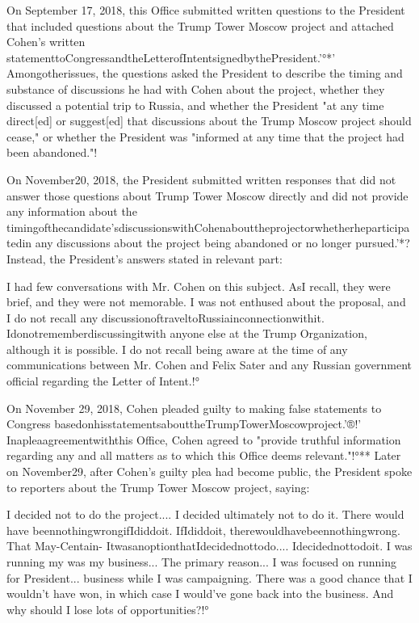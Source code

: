 On September 17, 2018, this Office submitted written questions to the President that included questions about the Trump Tower Moscow project and attached Cohen's written statementtoCongressandtheLetterofIntentsignedbythePresident.'°*'
Amongotherissues, the questions asked the President to describe the timing and substance of discussions he had with Cohen about the project, whether they discussed a potential trip to Russia, and whether the President "at any time direct[ed] or suggest[ed] that discussions about the Trump Moscow project should cease," or whether the President was "informed at any time that the project had been abandoned."!%

On November20, 2018, the President submitted written responses that did not answer those questions about Trump Tower Moscow directly and did not provide any information about the timingofthecandidate'sdiscussionswithCohenabouttheprojectorwhetherheparticipatedin any discussions about the project being abandoned or no longer pursued.'*?
Instead, the President's answers stated in relevant part:

I had few conversations with Mr. Cohen on this subject.
AsI recall, they were brief, and they were not memorable.
I was not enthused about the proposal, and I do not recall any discussionoftraveltoRussiainconnectionwithit.
Idonotrememberdiscussingitwith anyone else at the Trump Organization, although it is possible.
I do not recall being aware at the time of any communications between Mr. Cohen and Felix Sater and any Russian government official regarding the Letter of Intent.!°

On November 29, 2018, Cohen pleaded guilty to making false statements to Congress basedonhisstatementsabouttheTrumpTowerMoscowproject.'®!'
Inapleaagreementwiththis Office, Cohen agreed to "provide truthful information regarding any and all matters as to which this Office deems relevant."!°**
Later on November29, after Cohen's guilty plea had become public, the President spoke to reporters about the Trump Tower Moscow project, saying:

I decided not to do the project....
I decided ultimately not to do it.
There would have beennothingwrongifIdiddoit.
IfIdiddoit, therewouldhavebeennothingwrong.
That
May-Centain-
ItwasanoptionthatIdecidednottodo....
Idecidednottodoit.
I was running my
was my business...
The primary reason...
I was focused on running for President...
business while I was campaigning.
There was a good chance that I wouldn't have won, in which case I would've gone back into the business.
And why should I lose lots of opportunities?!°

